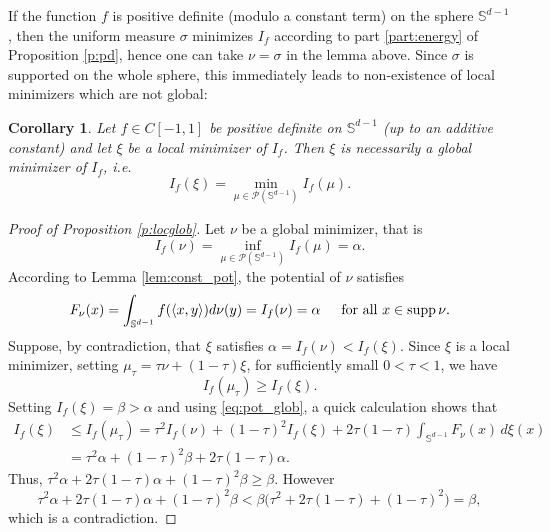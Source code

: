 \documentclass[11pt, leqno]{amsart}
\def\S{\mathbb S}
\def\supp{\operatorname{supp}}
\newtheorem{corollary}[theorem]{Corollary}
\theoremstyle{definition}
\numberwithin{equation}{section}
\begin{document}
If the function $f$ is positive definite (modulo a constant term) on the sphere $\S^{d-1}$, then the uniform measure $\sigma$ minimizes $I_f$ according to part  \eqref{part:energy} of Proposition \ref{p:pd}, hence one can take $\nu = \sigma $ in the lemma above.  Since $\sigma$ is supported on the whole sphere, this immediately leads to non-existence of local minimizers  which are not global:

\begin{corollary}\label{cor:locglob}
Let $ f\in C[-1,1]$ be positive definite on $\S^{d-1}$ (up to an additive constant)  and let $\xi$ be a local minimizer of $I_f$. Then $\xi$ is necessarily a global minimizer of $I_f$, i.e. $$ I_f (\xi ) = \min_{\mu \in \mathcal P (\S^{d-1})} I_f (\mu). $$
\end{corollary}



\begin{proof}[Proof of Proposition \ref{p:locglob}] Let $\nu$ be a global minimizer, that is $$I_{f}(\nu)=\inf\limits_{\mu\in\mathcal{P}(\S^{d-1})} I_{f}(\mu) = \alpha.$$ 
According to Lemma \ref{lem:const_pot}, the potential of $\nu$ satisfies
\begin{equation}\label{eq:pot_glob}
  F_\nu(x)  = \int_{\mathbb{S}^{d-1}} f( \langle x, y \rangle) d \nu(y)  =  I_f (\nu) = \alpha\,\,\, \quad \textup{for all $x \in\supp \nu$.}
  \end{equation}
Suppose, by contradiction, that $\xi$  satisfies $\alpha=I_{f}(\nu)<I_{f}(\xi)$. Since $\xi$ is a local minimizer, setting $\mu_\tau = \tau\nu+(1-\tau)\xi$, for sufficiently small $0< \tau<1$, we have
\begin{equation}\label{eq:minmulambda}
I_{f}(\mu_\tau )\geq I_{f}(\xi).
\end{equation}
Setting $I_{f}(\xi)=\beta >\alpha$ and  using  \eqref{eq:pot_glob}, 
a quick calculation shows that
\begin{align*}
I_f (\xi) & \le  I_f (\mu_\tau) =  \tau^2  I_f (\nu) + (1-\tau)^2 I_f (\xi) + 2\tau(1-\tau) \int_{\S^{d-1}}F_\nu (x) \, d\xi (x)  \\
&=\tau^2\alpha+(1-\tau)^2\beta +2\tau(1-\tau)\alpha.
\end{align*}
Thus, $\tau^2\alpha+2\tau(1-\tau)\alpha+(1-\tau)^2\beta\geq \beta$. 
However $$ \tau^2\alpha+2\tau(1-\tau)\alpha+(1-\tau)^2\beta < \beta \big(  \tau^2+2\tau(1-\tau)+(1-\tau)^2 \big) = \beta,$$ which is a contradiction. 
\end{proof}
\end{document}
